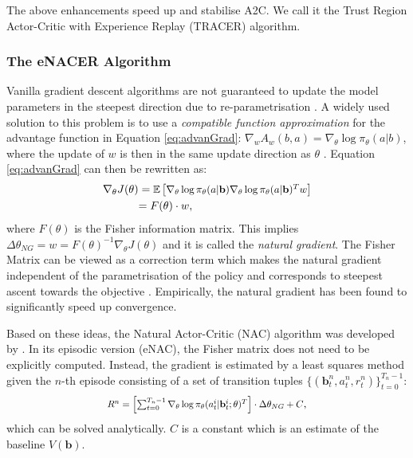 \documentclass[11pt,a4paper]{article}
\newcommand*{\Scale}[2][4]{\scalebox{#1}{$#2$}}%
\begin{document}
The above enhancements speed up and stabilise A2C. We call it the Trust Region Actor-Critic with Experience Replay (TRACER) algorithm.

\subsubsection{The eNACER Algorithm}
\label{sec:enac}

Vanilla gradient descent algorithms are not guaranteed to update the model parameters in the steepest direction due to re-parametrisation \cite{amari1998natural,martens2014new}.
A widely used solution to this problem is to use a {\it compatible function approximation} for the advantage function
in Equation \ref{eq:advanGrad}: $\nabla_w A_w(b,a) = \nabla_\theta \log \pi_{\theta}(a|b)$, where the update of $w$ is then in the same update direction as $\theta$ \cite{sutton1999policy}. Equation \ref{eq:advanGrad} can then be rewritten as: 
\begin{equation*} \label{eq:naturalGrad}
\begin{aligned}
\Scale[1]{\nabla_\theta J(\theta)} &=\Scale[0.93]{ \mathbb{E} \left[ \nabla_\theta \log \pi_{\theta}(a|\mathbf{b}) \nabla_\theta \log \pi_{\theta}(a|\mathbf{b})^T w \right]} \\
&{= F(\theta) \cdot w},
\end{aligned}
\end{equation*}
where $F(\theta)$ is the Fisher information matrix. This implies $\Delta {\theta_{NG}} = w = F(\theta)^{-1} {\nabla_\theta J(\theta)}$ and it is called the {\it natural gradient}. 
The Fisher Matrix can be viewed as a correction term which makes the natural gradient independent of the parametrisation of the policy and corresponds to steepest ascent towards the objective \cite{martens2014new}.
Empirically, the natural gradient has been found to significantly speed up convergence.

Based on these ideas, the Natural Actor-Critic (NAC) algorithm was developed by . In its episodic version (eNAC), the Fisher matrix does not need to be explicitly computed.
Instead, the gradient is estimated by a least squares method given
the $n$-th episode consisting of a set of transition tuples $\{(\mathbf{b}_t^n, a_t^n, r_t^n)\}_{t=0}^{T_n -1}$:
\begin{equation}
\label{eq:enac}
\Scale[0.85]{ R^n = \left[ \sum_{t=0}^{T_n -1} \nabla_\theta \log \pi_\theta(a_t^i|\mathbf{b}_t^i; \theta)^T \right] \cdot \Delta {\theta_{NG}} + C},
\end{equation}
which can be solved analytically. $C$ is a constant which is an estimate of the baseline 
$V(\mathbf{b})$.
\end{document}
